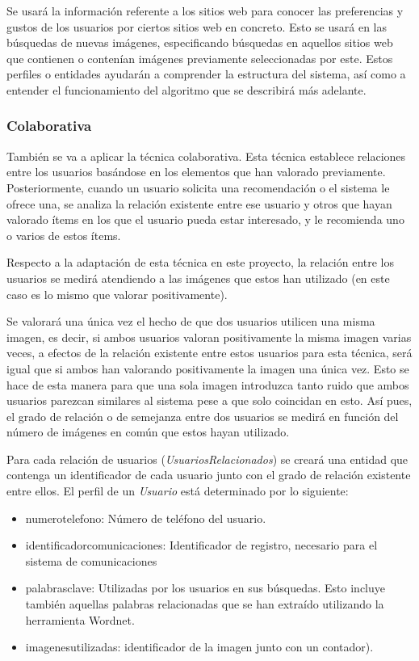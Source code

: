 Se usará la información referente a los sitios web para conocer las preferencias y gustos de los usuarios por ciertos sitios web en concreto. Esto se usará en las búsquedas de nuevas imágenes, especificando búsquedas en aquellos sitios web que contienen o contenían imágenes previamente seleccionadas por este. Estos perfiles o entidades ayudarán a comprender la estructura del sistema, así como a entender el funcionamiento del algoritmo que se describirá más adelante.\\

\subsubsection{Colaborativa}


También se va a aplicar la técnica colaborativa. Esta técnica establece relaciones entre los usuarios basándose en los elementos que han valorado previamente. Posteriormente, cuando un usuario solicita una recomendación o el sistema le ofrece una, se analiza la relación existente entre ese usuario y otros que hayan valorado ítems en los que el usuario pueda estar interesado, y le recomienda uno o varios de estos ítems.

Respecto a la adaptación de esta técnica en este proyecto, la relación entre los usuarios se medirá atendiendo a las imágenes que estos han utilizado (en este caso es lo mismo que valorar positivamente). 

Se valorará una única vez el hecho de que dos usuarios utilicen una misma imagen, es decir, si ambos usuarios valoran positivamente la misma imagen varias veces, a efectos de la relación existente entre estos usuarios para esta técnica, será igual que si ambos han valorando positivamente la imagen una única vez. Esto se hace de esta manera para que una sola imagen introduzca tanto ruido que ambos usuarios parezcan similares al sistema pese a que solo coincidan en esto. Así pues, el grado de relación o de semejanza entre dos usuarios se medirá en función del número de imágenes en común que estos hayan utilizado.

Para cada relación de usuarios (\textit{UsuariosRelacionados}) se creará una entidad que contenga un identificador de cada usuario junto con el grado de relación existente entre ellos. El perfil de un \textit{Usuario} está determinado por lo siguiente:

\begin{itemize}
\item numero\textunderscore telefono: Número de teléfono del usuario.
\item identificador\textunderscore comunicaciones: Identificador de registro, necesario para el sistema de comunicaciones
\item palabras\textunderscore clave: Utilizadas por los usuarios en sus búsquedas. Esto incluye también aquellas palabras relacionadas que se han extraído utilizando la herramienta Wordnet.
\item imagenes\textunderscore utilizadas: identificador de la imagen junto con un contador).
\end{itemize}

